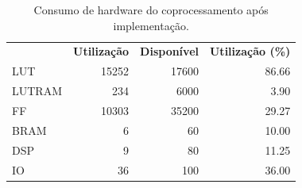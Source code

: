 \begin{table}[!h]
	\centering
	\caption{Consumo de hardware do coprocessamento após implementação.}
	\label{consumo_geral}
	\begin{tabular}{lrrr}
		\rowcolor[HTML]{DAE8FC} 
		\multicolumn{1}{c}{\cellcolor[HTML]{DAE8FC}\textbf{Recursos}} & \multicolumn{1}{c}{\cellcolor[HTML]{DAE8FC}\textbf{Utilização}} & \multicolumn{1}{c}{\cellcolor[HTML]{DAE8FC}\textbf{Disponível}} & \multicolumn{1}{c}{\cellcolor[HTML]{DAE8FC}\textbf{Utilização (\%)}} \\
		LUT                                                           & 15252                                                           & 17600                                                           & 86.66                                                                \\
		\rowcolor[HTML]{DAE8FC} 
		LUTRAM                                                        & 234                                                             & 6000                                                            & 3.90                                                                 \\
		FF                                                            & 10303                                                           & 35200                                                           & 29.27                                                                \\
		\rowcolor[HTML]{DAE8FC} 
		BRAM                                                          & 6                                                               & 60                                                              & 10.00                                                                \\
		DSP                                                           & 9                                                               & 80                                                              & 11.25                                                                \\
		\rowcolor[HTML]{DAE8FC} 
		IO                                                            & 36                                                              & 100                                                             & 36.00                                                                \\

\end{tabular}
\end{table}
